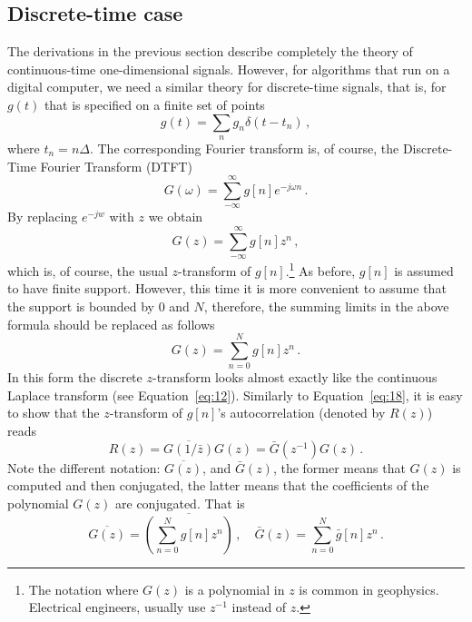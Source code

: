 \subsection{Discrete-time case}
\label{sec:discrete-case}
The derivations in the previous section describe completely the theory
of continuous-time one-dimensional signals. However, for algorithms
that run on a digital computer, we need a similar theory for
discrete-time signals, that is, for $g(t)$ that is specified on a
finite set of points
\begin{equation}
  \label{eq:1}
  g(t) = \sum_{n}g_{n}\delta(t-t_{n})\,,
\end{equation}
where $t_{n} = n\Delta$. The corresponding Fourier
transform is, of course, the Discrete-Time Fourier Transform (DTFT)
\begin{equation}
  \label{eq:2}
  G(\omega) = \sum_{-\infty}^{\infty}g[n]e^{-j\omega n} \,. 
\end{equation}
By replacing $e^{-jw}$ with $z$ we obtain
\begin{equation}
  \label{eq:42}
  G(z) = \sum_{-\infty}^{\infty}g[n]z^{n}\,, 
\end{equation}
which is, of course, the usual $z$-transform of $g[n]$.\footnote{The notation
  where $G(z)$ is a polynomial in $z$ is common in
  geophysics. Electrical engineers, usually use $z^{-1}$ instead of
  $z$.} As before, $g[n]$ is assumed to have finite support. However,
this time it is more convenient to assume that the support is bounded
by $0$ and $N$, therefore, the summing limits in the
above formula should be replaced as follows
\begin{equation}
  \label{eq:45}
  G(z) = \sum_{n=0}^{N}g[n]z^{n}\,. 
\end{equation}
In this form the discrete $z$-transform looks almost exactly like the
continuous Laplace transform (see Equation~\eqref{eq:12}). Similarly
to Equation~\eqref{eq:18}, it is easy
to show that the $z$-transform of $g[n]$'s autocorrelation (denoted by $R(z)$) reads
\begin{equation}
  \label{eq:46}
  R(z) = \overline{G(1/\bar z)}G(z) =
  \bar G(z^{-1}) G(z)\,. 
\end{equation}
Note the different notation: $\overline{G(z)}$, and $\bar
G(z)$, the former means that $G(z)$ is computed and then conjugated,
the latter means that the coefficients of the polynomial $G(z)$ are
conjugated. That is
\begin{equation}
  \label{eq:118}
  \overline{G(z)} = \overline{
    \left(
      \sum_{n=0}^{N}g[n]z^{n}
    \right)} \,,
  \quad
  \bar G(z) =  \sum_{n=0}^{N}\bar g[n]z^{n} \,. 
\end{equation}

